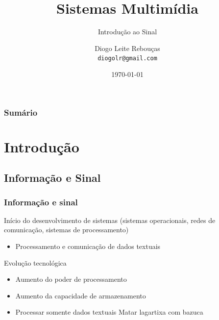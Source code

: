 \documentclass[xcolor]{beamer}
\title[Sistemas Multimídia]
{
    Sistemas Multimídia
}
\subtitle{Introdução ao Sinal}
\author[Diogo Leite Rebouças]
{
    Diogo Leite Rebouças\\
    {\tt diogolr@gmail.com}
}
\institute
{
    Universidade do Estado do Rio Grande do Norte\\
    Departamento de Informática
}
\date{\today}
\begin{document}
\maketitle


\begin{frame}
    \frametitle{Sumário}
    \tableofcontents
\end{frame}

\section{Introdução}
\subsection{Informação e Sinal}
\begin{frame}
    \frametitle{Informação e sinal}

    Início do desenvolvimento de sistemas (sistemas operacionais, redes de
    comunicação, sistemas de processamento)

    \begin{itemize}
        \item Processamento e comunicação de dados textuais
    \end{itemize}

    Evolução tecnológica

    \begin{itemize}
        \item Aumento do poder de processamento
        \item Aumento da capacidade de armazenamento
        \item Processar somente dados textuais \implica Matar lagartixa com
              bazuca
    \end{itemize}
\end{frame}
\end{document}
